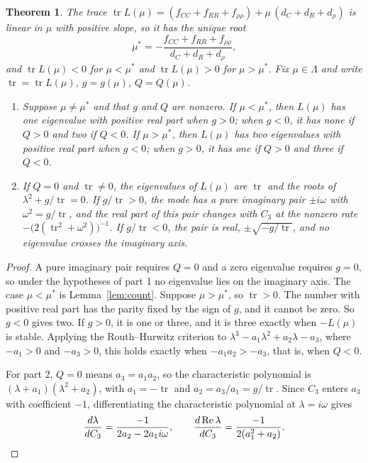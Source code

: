 \documentclass[11pt]{article}
\newtheorem{theorem}{Theorem}
\theoremstyle{remark}
\begin{document}
\begin{theorem}\label{thm:count}
The trace $\operatorname{tr}L(\mu)=(f_{CC}+f_{RR}+f_{\rho\rho})+\mu\,(d_C+d_R+d_\rho)$ is linear in $\mu$ with positive slope, so it has the unique root
\[
\mu^*=-\frac{f_{CC}+f_{RR}+f_{\rho\rho}}{d_C+d_R+d_\rho},
\]
and $\operatorname{tr}L(\mu)<0$ for $\mu<\mu^*$ and $\operatorname{tr}L(\mu)>0$ for $\mu>\mu^*$. Fix $\mu\in\Lambda$ and write $\operatorname{tr}=\operatorname{tr}L(\mu)$, $g=g(\mu)$, $Q=Q(\mu)$.
\begin{enumerate}
\item Suppose $\mu\neq\mu^*$ and that $g$ and $Q$ are nonzero. If $\mu<\mu^*$, then $L(\mu)$ has one eigenvalue with positive real part when $g>0$; when $g<0$, it has none if $Q>0$ and two if $Q<0$. If $\mu>\mu^*$, then $L(\mu)$ has two eigenvalues with positive real part when $g<0$; when $g>0$, it has one if $Q>0$ and three if $Q<0$.
\item If $Q=0$ and $\operatorname{tr}\neq0$, the eigenvalues of $L(\mu)$ are $\operatorname{tr}$ and the roots of $\lambda^2+g/\operatorname{tr}=0$. If $g/\operatorname{tr}>0$, the mode has a pure imaginary pair $\pm i\omega$ with $\omega^2=g/\operatorname{tr}$, and the real part of this pair changes with $C_3$ at the nonzero rate $-\bigl(2(\operatorname{tr}^2+\omega^2)\bigr)^{-1}$. If $g/\operatorname{tr}<0$, the pair is real, $\pm\sqrt{-g/\operatorname{tr}}$, and no eigenvalue crosses the imaginary axis.
\end{enumerate}
\end{theorem}

\begin{proof}
A pure imaginary pair requires $Q=0$ and a zero eigenvalue requires $g=0$, so under the hypotheses of part 1 no eigenvalue lies on the imaginary axis. The case $\mu<\mu^*$ is Lemma~\ref{lem:count}. Suppose $\mu>\mu^*$, so $\operatorname{tr}>0$. The number with positive real part has the parity fixed by the sign of $g$, and it cannot be zero. So $g<0$ gives two. If $g>0$, it is one or three, and it is three exactly when $-L(\mu)$ is stable. Applying the Routh--Hurwitz criterion to $\lambda^3-a_1\lambda^2+a_2\lambda-a_3$, where $-a_1>0$ and $-a_3>0$, this holds exactly when $-a_1a_2>-a_3$, that is, when $Q<0$.

For part 2, $Q=0$ means $a_3=a_1a_2$, so the characteristic polynomial is $(\lambda+a_1)(\lambda^2+a_2)$, with $a_1=-\operatorname{tr}$ and $a_2=a_3/a_1=g/\operatorname{tr}$. Since $C_3$ enters $a_3$ with coefficient $-1$, differentiating the characteristic polynomial at $\lambda=i\omega$ gives
\[
\frac{d\lambda}{dC_3}=\frac{-1}{2a_2-2a_1i\omega},
\qquad
\frac{d\operatorname{Re}\lambda}{dC_3}=\frac{-1}{2(a_1^2+a_2)}.
\qedhere
\]
\end{proof}
\end{document}
